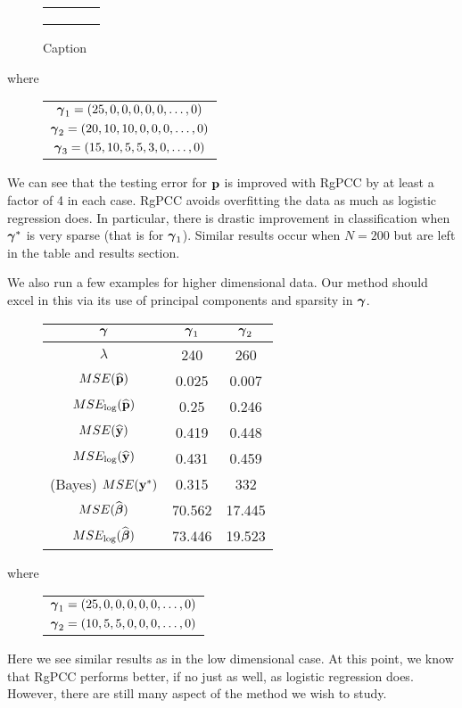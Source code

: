 \documentclass[main.tex]{subfiles}
\begin{document}
\begin{figure}[H]
    \centering
    \begin{tabular}{|c|c|c|c|} \hline \\
         &  \\
         & 
    \end{tabular}
    \caption{Caption}
    \label{fig:my_label}
\end{figure}

where

\begin{figure}[H]
	\begin{tabular}{c}
		$\boldsymbol \gamma_1 = (25, 0, 0, 0, 0, 0, \ldots , 0)$ \\
		$\boldsymbol \gamma_2 = (20, 10, 10, 0, 0, 0, \ldots , 0)$ \\
		$\boldsymbol \gamma_3 = (15, 10, 5, 5, 3, 0, \ldots , 0)$
	\end{tabular}
\end{figure}
We can see that the testing error for $\mathbf{p}$ is improved with RgPCC by at least a factor of 4 in each case. RgPCC avoids overfitting the data as much as logistic regression does. In particular, there is drastic improvement in classification when $\boldsymbol \gamma^*$ is very sparse (that is for $\boldsymbol \gamma_1$). Similar results occur when $N = 200$ but are left in the table and results section.

We also run a few examples for higher dimensional data. Our method should excel in this via its use of principal components and sparsity in $\boldsymbol \gamma$.

\begin{figure}[H]
	\begin{tabular}{c|c|c}
		$\boldsymbol \gamma$ & $\boldsymbol \gamma_1$ & $\boldsymbol \gamma_2$ \\ \hline
		$\lambda$ & 240 & 260\\
		$MSE(\widehat{\mathbf{p}})$ & 0.025 & 0.007 \\
		$MSE_{\log}(\widehat{\mathbf{p}})$ & 0.25 & 0.246 \\
		$MSE(\widehat{\mathbf{y}})$ & 0.419 &  0.448 \\
		$MSE_{\log}(\widehat{\mathbf{y}})$ & 0.431 & 0.459 \\
		(Bayes) $MSE(\mathbf{y}^*)$ & 0.315 & 332  \\
		$MSE(\widehat{\boldsymbol \beta})$ & 70.562 & 17.445 \\
		$MSE_{\log}(\widehat{\boldsymbol \beta})$ & 73.446 & 19.523
	\end{tabular}
	\caption{}
	\label{figure:200-100-table}
\end{figure}

where

\begin{figure}[H]
	\begin{tabular}{c}
		$\boldsymbol \gamma_1 = (25, 0, 0, 0, 0, 0, \ldots , 0)$ \\
		$\boldsymbol \gamma_2 = (10, 5, 5, 0, 0, 0, \ldots , 0)$
	\end{tabular}
\end{figure}

Here we see similar results as in the low dimensional case. At this point, we know that RgPCC performs better, if no just as well, as logistic regression does. However, there are still many aspect of the method we wish to study.
\end{document}
